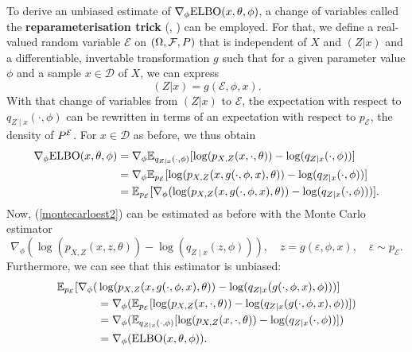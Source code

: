 To derive an unbiased estimate of $\nabla_{\phi} \elbo(x, \theta, \phi)$, a change of variables called the \textbf{reparameterisation trick} (\cite[pp.~20f.]{Kingma2019}, \cite[pp.~4f.]{Kingma2013}) can be employed. For that, we define a real-valued random variable $\mathcal{E}$ on $(\Omega, \mathcal{F}, \P)$ that is independent of $X$ and $(Z\vert x)$ and a differentiable, invertable transformation $g$ such that for a given parameter value $\phi$ and a sample $x \in \mathcal{D}$ of $X$, we can express
$$
	(Z\vert x) = g(\mathcal{E}, \phi, x).
$$
With that change of variables from $(Z\vert x)$ to $\mathcal{E}$, the expectation with respect to $q_{Z\mid x}(\cdot, \phi)$ can be rewritten in terms of an expectation with respect to $p_{\mathcal{E}}$, the density of $\P^{\mathcal{E}}$. For $x\in \mathcal{D}$ as before, we thus obtain
\begin{equation}\label{montecarloest2}
\begin{split}
	\nabla_{\phi} \elbo(x, \theta, \phi) &= \nabla_{\phi} \E_{q_{Z\mid x}(\cdot, \phi)}[\log(p_{X,Z}(x, \cdot, \theta)) - \log(q_{Z\mid x}(\cdot, \phi))] \\
	&= \nabla_{\phi} \E_{p_{\mathcal{E}}}[\log(p_{X,Z}(x, g(\cdot, \phi, x), \theta)) - \log(q_{Z\mid x}(\cdot, \phi))] \\
	&= \E_{p_{\mathcal{E}}}[\nabla_{\phi}(\log(p_{X,Z}(x, g(\cdot, \phi, x), \theta)) - \log(q_{Z\mid x}(\cdot, \phi)))].
\end{split}
\end{equation}
Now, (\ref{montecarloest2}) can be estimated as before with the Monte Carlo estimator 
$$
\nabla_{\phi}(\log(p_{X,Z}(x, z, \theta)) - \log(q_{Z\mid x}(z, \phi))), \quad z=g(\varepsilon,\phi,x), \quad \varepsilon \sim p_{\mathcal{E}}.
$$
Furthermore, we can see that this estimator is unbiased:
\begin{equation*}
\begin{split}
	\E_{p_{\mathcal{E}}}[\nabla_{\phi}(&\log(p_{X,Z}(x, g(\cdot, \phi, x), \theta)) - \log(q_{Z\mid x}(g(\cdot, \phi, x), \phi)))] \\
			&= \nabla_{\phi}(\E_{p_{\mathcal{E}}}[\log(p_{X,Z}(x, \cdot, \theta)) - \log(q_{Z\mid x}(g(\cdot, \phi, x), \phi))]) \\
			&= \nabla_{\phi}(\E_{q_{Z\mid x}(\cdot, \phi)}[\log(p_{X,Z}(x, \cdot, \theta)) - \log(q_{Z\mid x}(\cdot, \phi))]) \\
			&= \nabla_{\phi}(\elbo(x,\theta, \phi)).
\end{split}
\end{equation*}

